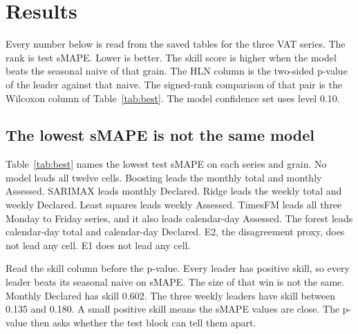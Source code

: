 \section{Results}
\label{sec:results}

Every number below is read from the saved tables for the three VAT series.
The rank is test sMAPE.
Lower is better.
The skill score is higher when the model beats the seasonal naive of that grain.
The HLN column is the two-sided p-value of the leader against that naive.
The signed-rank comparison of that pair is the Wilcoxon column of Table~\ref{tab:best}.
The model confidence set uses level 0.10.

\subsection{The lowest sMAPE is not the same model}
\label{sec:top3}

Table~\ref{tab:best} names the lowest test sMAPE on each series and grain.
No model leads all twelve cells.
Boosting leads the monthly total and monthly Assessed.
SARIMAX leads monthly Declared.
Ridge leads the weekly total and weekly Declared.
Least squares leads weekly Assessed.
TimesFM leads all three Monday to Friday series, and it also leads calendar-day Assessed.
The forest leads calendar-day total and calendar-day Declared.
E2, the disagreement proxy, does not lead any cell.
E1 does not lead any cell.

\begin{table}[ht]
  \caption{Lowest test sMAPE on each series and grain.
  Skill is \(1 - \mathrm{sMAPE}/\mathrm{sMAPE}_{\mathrm{naive}}\) against the seasonal naive of that grain.
  HLN \(p\) is the two-sided Diebold-Mariano test of that leader against the same naive, with the small-sample correction.
  The Wilcoxon column is the signed-rank test of that same pair.
  The pairs among the other models are in Table~\ref{tab:wilcoxon-pairs}.
  A p-value below 0.05 is discussed in the text.
  It is not a second rank.}
  \label{tab:best}
  \centering
  \scriptsize
  
\end{table}

Read the skill column before the p-value.
Every leader has positive skill, so every leader beats its seasonal naive on sMAPE.
The size of that win is not the same.
Monthly Declared has skill 0.602.
The three weekly leaders have skill between 0.135 and 0.180.
A small positive skill means the sMAPE values are close.
The p-value then asks whether the test block can tell them apart.

